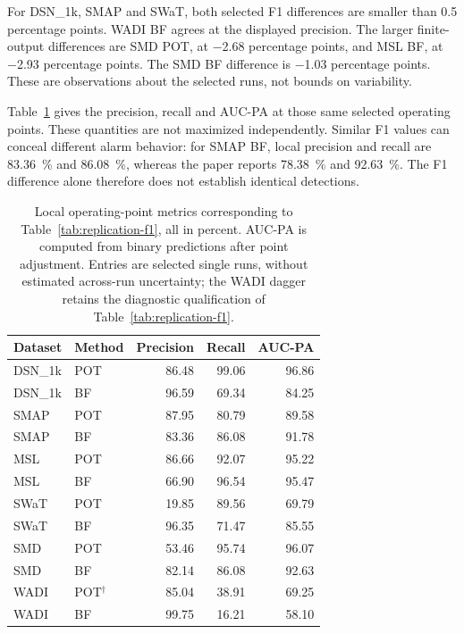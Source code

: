 For DSN\_1k, \ac{SMAP} and SWaT, both selected F1 differences are smaller
than \num{0.5} percentage points. WADI BF agrees at the displayed precision.
The larger finite-output differences are \ac{SMD} \ac{POT}, at
\num{-2.68} percentage points, and \ac{MSL} BF, at \num{-2.93} percentage
points. The \ac{SMD} BF difference is \num{-1.03} percentage points.
These are observations about the selected runs, not bounds on variability.

Table~\ref{tab:replication-operating-points} gives the precision, recall
and AUC-PA at those same selected operating points. These quantities are
not maximized independently. Similar F1 values can conceal different
alarm behavior: for \ac{SMAP} BF, local precision and recall are
\SI{83.36}{\percent} and \SI{86.08}{\percent}, whereas the paper reports
\SI{78.38}{\percent} and \SI{92.63}{\percent}. The F1 difference alone
therefore does not establish identical detections.

\begin{table}[htbp]
  \centering
  \small
  \setlength{\tabcolsep}{10pt}
  \begin{tabular}{@{}llrrr@{}}
    \toprule
    Dataset & Method & Precision & Recall & AUC-PA \\
    \midrule
    DSN\_1k & \acs{POT} & \num{86.48} & \num{99.06} & \num{96.86} \\
    DSN\_1k & BF & \num{96.59} & \num{69.34} & \num{84.25} \\
    \acs{SMAP} & \acs{POT} & \num{87.95} & \num{80.79} & \num{89.58} \\
    \acs{SMAP} & BF & \num{83.36} & \num{86.08} & \num{91.78} \\
    \acs{MSL} & \acs{POT} & \num{86.66} & \num{92.07} & \num{95.22} \\
    \acs{MSL} & BF & \num{66.90} & \num{96.54} & \num{95.47} \\
    SWaT & \acs{POT} & \num{19.85} & \num{89.56} & \num{69.79} \\
    SWaT & BF & \num{96.35} & \num{71.47} & \num{85.55} \\
    \acs{SMD} & \acs{POT} & \num{53.46} & \num{95.74} & \num{96.07} \\
    \acs{SMD} & BF & \num{82.14} & \num{86.08} & \num{92.63} \\
    WADI & \acs{POT}\(^{\dagger}\) & \num{85.04} & \num{38.91} & \num{69.25} \\
    WADI & BF & \num{99.75} & \num{16.21} & \num{58.10} \\
    \bottomrule
  \end{tabular}
  \caption{Local operating-point metrics corresponding to
  Table~\ref{tab:replication-f1}, all in percent. AUC-PA is computed from
  binary predictions after point adjustment. Entries are selected single
  runs, without estimated across-run uncertainty; the WADI dagger retains
  the diagnostic qualification of Table~\ref{tab:replication-f1}.}
  \label{tab:replication-operating-points}
\end{table}

